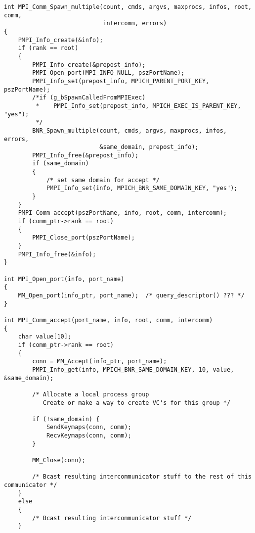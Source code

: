 \documentclass{article}
\begin{document}
\begin{small}
\begin{verbatim}
int MPI_Comm_Spawn_multiple(count, cmds, argvs, maxprocs, infos, root, comm,
                            intercomm, errors)
{
    PMPI_Info_create(&info);
    if (rank == root)
    {
        PMPI_Info_create(&prepost_info);
        PMPI_Open_port(MPI_INFO_NULL, pszPortName);
        PMPI_Info_set(prepost_info, MPICH_PARENT_PORT_KEY, pszPortName);
        /*if (g_bSpawnCalledFromMPIExec) 
         *    PMPI_Info_set(prepost_info, MPICH_EXEC_IS_PARENT_KEY, "yes");
         */
        BNR_Spawn_multiple(count, cmds, argvs, maxprocs, infos, errors, 
                           &same_domain, prepost_info);
        PMPI_Info_free(&prepost_info);
        if (same_domain)
        {
            /* set same domain for accept */
            PMPI_Info_set(info, MPICH_BNR_SAME_DOMAIN_KEY, "yes");
        }
    }
    PMPI_Comm_accept(pszPortName, info, root, comm, intercomm);
    if (comm_ptr->rank == root)
    {
        PMPI_Close_port(pszPortName);
    }
    PMPI_Info_free(&info);
}

int MPI_Open_port(info, port_name)
{
    MM_Open_port(info_ptr, port_name);  /* query_descriptor() ??? */
}

int MPI_Comm_accept(port_name, info, root, comm, intercomm)
{
    char value[10];
    if (comm_ptr->rank == root)
    {
        conn = MM_Accept(info_ptr, port_name);
        PMPI_Info_get(info, MPICH_BNR_SAME_DOMAIN_KEY, 10, value, &same_domain);

        /* Allocate a local process group
           Create or make a way to create VC's for this group */

        if (!same_domain) {
            SendKeymaps(conn, comm);
            RecvKeymaps(conn, comm);
        }

        MM_Close(conn);

        /* Bcast resulting intercommunicator stuff to the rest of this communicator */
    }
    else
    {
        /* Bcast resulting intercommunicator stuff */
    }


\end{verbatim}
\end{small}
\end{document}
